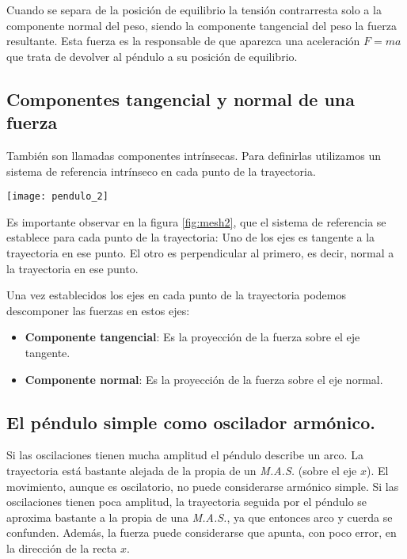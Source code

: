 \documentclass[11pt]{article}
\newenvironment{Figuras}
  {\par\medskip\noindent\minipage{\linewidth}}
  {\endminipage\par\medskip}
\begin{document}
\begin{multicols}{2}
Cuando se separa de la posición de equilibrio la tensión contrarresta solo a la componente normal del peso, siendo la componente tangencial del peso la fuerza resultante. Esta fuerza es la responsable de que aparezca una aceleración $ F = m a$ que trata de devolver al péndulo a su posición de equilibrio.

	\subsection{Componentes tangencial y normal de una fuerza}

	También son llamadas componentes intrínsecas. Para definirlas utilizamos un sistema de referencia intrínseco en cada punto de la trayectoria.

\begin{Figuras}
	\centering
    \texttt{[image: pendulo\_2]}
    \label{fig:mesh2}
\end{Figuras}

Es importante observar en la figura \ref{fig:mesh2}, que el sistema de referencia se establece para cada punto de la trayectoria: Uno de los ejes es tangente a la trayectoria en ese punto. El otro es perpendicular al primero, es decir, normal a la trayectoria en ese punto.

Una vez establecidos los ejes en cada punto de la trayectoria podemos descomponer las fuerzas en estos ejes:

\begin{itemize}
	\item \textbf{Componente tangencial}: Es la proyección de la fuerza sobre el eje tangente.\\
	\item \textbf{Componente normal}: Es la proyección de la fuerza sobre el eje normal.
\end{itemize}

	\subsection{El péndulo simple como oscilador armónico.}
Si las oscilaciones tienen mucha amplitud el péndulo describe un arco. La trayectoria está bastante alejada de la propia de un \textit{M.A.S.} (sobre el eje  $x$). El movimiento, aunque es oscilatorio, no puede considerarse armónico simple. Si las oscilaciones tienen poca amplitud, la trayectoria seguida por el péndulo se aproxima bastante a la propia de una \textit{M.A.S.}, ya que entonces arco y cuerda se confunden. Además, la fuerza puede considerarse que apunta, con poco error, en la dirección de la recta $x$.


\end{multicols}
\end{document}
